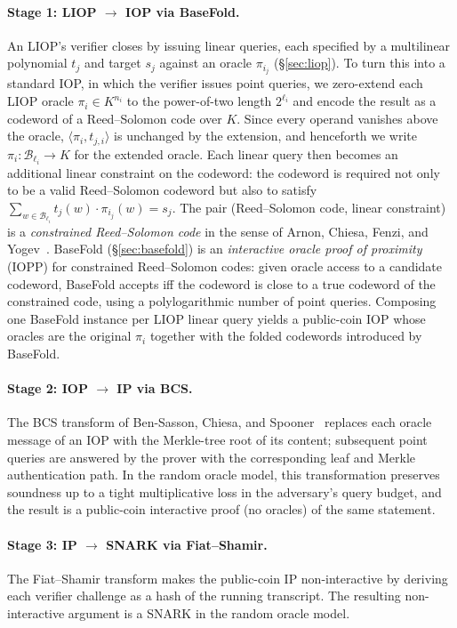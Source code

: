 \documentclass{article}
\theoremstyle{definition}
\newcommand{\BB}{\mathcal{B}}
\begin{document}
\paragraph{Stage 1: LIOP \texorpdfstring{$\to$}{to} IOP via BaseFold.}
An LIOP's verifier closes by issuing linear queries, each specified by a multilinear polynomial $t_j$ and target $s_j$ against an oracle $\pi_{i_j}$ (\S\ref{sec:liop}). To turn this into a standard IOP, in which the verifier issues point queries, we zero-extend each LIOP oracle $\pi_i \in K^{n_i}$ to the power-of-two length $2^{\ell_i}$ and encode the result as a codeword of a Reed--Solomon code over $K$. Since every operand vanishes above the oracle, $\langle \pi_i, t_{j, i} \rangle$ is unchanged by the extension, and henceforth we write $\pi_i \colon \BB_{\ell_i} \to K$ for the extended oracle. Each linear query then becomes an additional linear constraint on the codeword: the codeword is required not only to be a valid Reed--Solomon codeword but also to satisfy $\sum_{w \in \BB_{\ell_i}} t_j(w) \cdot \pi_{i_j}(w) = s_j$. The pair (Reed--Solomon code, linear constraint) is a \emph{constrained Reed--Solomon code} in the sense of Arnon, Chiesa, Fenzi, and Yogev~\cite[\S 4.1]{Arnon:2025aa}. BaseFold (\S\ref{sec:basefold}) is an \emph{interactive oracle proof of proximity} (IOPP) for constrained Reed--Solomon codes: given oracle access to a candidate codeword, BaseFold accepts iff the codeword is close to a true codeword of the constrained code, using a polylogarithmic number of point queries. Composing one BaseFold instance per LIOP linear query yields a public-coin IOP whose oracles are the original $\pi_i$ together with the folded codewords introduced by BaseFold.

\paragraph{Stage 2: IOP \texorpdfstring{$\to$}{to} IP via BCS.}
The BCS transform of Ben-Sasson, Chiesa, and Spooner~\cite{Ben-Sasson:2016aa} replaces each oracle message of an IOP with the Merkle-tree root of its content; subsequent point queries are answered by the prover with the corresponding leaf and Merkle authentication path. In the random oracle model, this transformation preserves soundness up to a tight multiplicative loss in the adversary's query budget, and the result is a public-coin interactive proof (no oracles) of the same statement.

\paragraph{Stage 3: IP \texorpdfstring{$\to$}{to} SNARK via Fiat--Shamir.}
The Fiat--Shamir transform makes the public-coin IP non-interactive by deriving each verifier challenge as a hash of the running transcript. The resulting non-interactive argument is a SNARK in the random oracle model.
\end{document}
